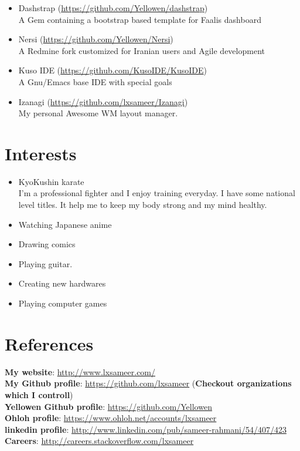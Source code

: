 \documentclass[a4paper,11pt]{article}
\begin{document}
\begin{itemize}
\item Dashstrap (\url{https://github.com/Yellowen/dashstrap})\\
  A Gem containing a bootstrap based template for Faalis dashboard

\item Nersi (\url{https://github.com/Yellowen/Nersi})\\
  A Redmine fork customized for Iranian users and Agile development

\item Kuso IDE (\url{https://github.com/KusoIDE/KusoIDE})\\
  A Gnu/Emacs base IDE with special goals

\item Izanagi (\url{https://github.com/lxsameer/Izanagi})\\
  My personal Awesome WM layout manager.


\end{itemize}



\section*{Interests}
\begin{itemize}

\item KyoKushin karate\\
  I’m a professional fighter and I enjoy training everyday. I have some national
  level titles. It help me to keep my body strong and my mind healthy.

\item Watching Japanese anime
\item Drawing comics
\item Playing guitar.
\item Creating new hardwares
\item Playing computer games
\end{itemize}

\section*{References}
\textbf{My website}: \url{http://www.lxsameer.com/}\\
\textbf{My Github profile}:  \url{https://github.com/lxsameer} (\textbf{Checkout organizations which I controll})\\
\textbf{Yellowen Github profile}: \url{https://github.com/Yellowen}\\
\textbf{Ohloh profile}: \url{https://www.ohloh.net/accounts/lxsameer}\\
\textbf{linkedin profile}: \url{http://www.linkedin.com/pub/sameer-rahmani/54/407/423}\\
\textbf{Careers}: \url{http://careers.stackoverflow.com/lxsameer}\\
\end{document}
